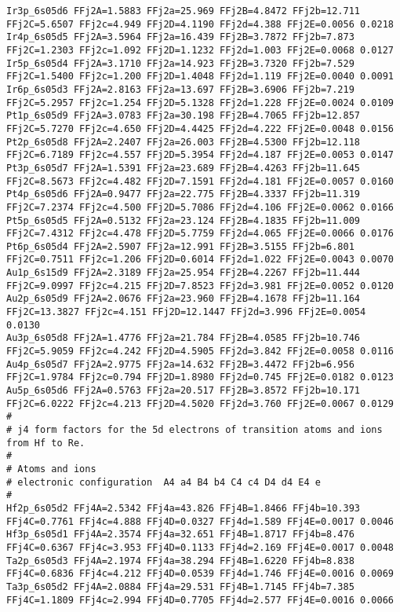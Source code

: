 {\begin{verbatim}
Ir3p_6s05d6 FFj2A=1.5883 FFj2a=25.969 FFj2B=4.8472 FFj2b=12.711 FFj2C=5.6507 FFj2c=4.949 FFj2D=4.1190 FFj2d=4.388 FFj2E=0.0056 0.0218 
Ir4p_6s05d5 FFj2A=3.5964 FFj2a=16.439 FFj2B=3.7872 FFj2b=7.873 FFj2C=1.2303 FFj2c=1.092 FFj2D=1.1232 FFj2d=1.003 FFj2E=0.0068 0.0127 
Ir5p_6s05d4 FFj2A=3.1710 FFj2a=14.923 FFj2B=3.7320 FFj2b=7.529 FFj2C=1.5400 FFj2c=1.200 FFj2D=1.4048 FFj2d=1.119 FFj2E=0.0040 0.0091 
Ir6p_6s05d3 FFj2A=2.8163 FFj2a=13.697 FFj2B=3.6906 FFj2b=7.219 FFj2C=5.2957 FFj2c=1.254 FFj2D=5.1328 FFj2d=1.228 FFj2E=0.0024 0.0109 
Pt1p_6s05d9 FFj2A=3.0783 FFj2a=30.198 FFj2B=4.7065 FFj2b=12.857 FFj2C=5.7270 FFj2c=4.650 FFj2D=4.4425 FFj2d=4.222 FFj2E=0.0048 0.0156 
Pt2p_6s05d8 FFj2A=2.2407 FFj2a=26.003 FFj2B=4.5300 FFj2b=12.118 FFj2C=6.7189 FFj2c=4.557 FFj2D=5.3954 FFj2d=4.187 FFj2E=0.0053 0.0147 
Pt3p_6s05d7 FFj2A=1.5391 FFj2a=23.689 FFj2B=4.4263 FFj2b=11.645 FFj2C=8.5673 FFj2c=4.482 FFj2D=7.1591 FFj2d=4.181 FFj2E=0.0057 0.0160 
Pt4p_6s05d6 FFj2A=0.9477 FFj2a=22.775 FFj2B=4.3337 FFj2b=11.319 FFj2C=7.2374 FFj2c=4.500 FFj2D=5.7086 FFj2d=4.106 FFj2E=0.0062 0.0166 
Pt5p_6s05d5 FFj2A=0.5132 FFj2a=23.124 FFj2B=4.1835 FFj2b=11.009 FFj2C=7.4312 FFj2c=4.478 FFj2D=5.7759 FFj2d=4.065 FFj2E=0.0066 0.0176 
Pt6p_6s05d4 FFj2A=2.5907 FFj2a=12.991 FFj2B=3.5155 FFj2b=6.801 FFj2C=0.7511 FFj2c=1.206 FFj2D=0.6014 FFj2d=1.022 FFj2E=0.0043 0.0070 
Au1p_6s15d9 FFj2A=2.3189 FFj2a=25.954 FFj2B=4.2267 FFj2b=11.444 FFj2C=9.0997 FFj2c=4.215 FFj2D=7.8523 FFj2d=3.981 FFj2E=0.0052 0.0120 
Au2p_6s05d9 FFj2A=2.0676 FFj2a=23.960 FFj2B=4.1678 FFj2b=11.164 FFj2C=13.3827 FFj2c=4.151 FFj2D=12.1447 FFj2d=3.996 FFj2E=0.0054 0.0130 
Au3p_6s05d8 FFj2A=1.4776 FFj2a=21.784 FFj2B=4.0585 FFj2b=10.746 FFj2C=5.9059 FFj2c=4.242 FFj2D=4.5905 FFj2d=3.842 FFj2E=0.0058 0.0116 
Au4p_6s05d7 FFj2A=2.9775 FFj2a=14.632 FFj2B=3.4472 FFj2b=6.956 FFj2C=1.9784 FFj2c=0.794 FFj2D=1.8980 FFj2d=0.745 FFj2E=0.0182 0.0123 
Au5p_6s05d6 FFj2A=0.5763 FFj2a=20.517 FFj2B=3.8572 FFj2b=10.171 FFj2C=6.0222 FFj2c=4.213 FFj2D=4.5020 FFj2d=3.760 FFj2E=0.0067 0.0129 
#
# j4 form factors for the 5d electrons of transition atoms and ions from Hf to Re.
#
# Atoms and ions
# electronic configuration  A4 a4 B4 b4 C4 c4 D4 d4 E4 e
#
Hf2p_6s05d2 FFj4A=2.5342 FFj4a=43.826 FFj4B=1.8466 FFj4b=10.393 FFj4C=0.7761 FFj4c=4.888 FFj4D=0.0327 FFj4d=1.589 FFj4E=0.0017 0.0046 
Hf3p_6s05d1 FFj4A=2.3574 FFj4a=32.651 FFj4B=1.8717 FFj4b=8.476 FFj4C=0.6367 FFj4c=3.953 FFj4D=0.1133 FFj4d=2.169 FFj4E=0.0017 0.0048 
Ta2p_6s05d3 FFj4A=2.1974 FFj4a=38.294 FFj4B=1.6220 FFj4b=8.838 FFj4C=0.6836 FFj4c=4.212 FFj4D=0.0539 FFj4d=1.746 FFj4E=0.0016 0.0069 
Ta3p_6s05d2 FFj4A=2.0884 FFj4a=29.531 FFj4B=1.7145 FFj4b=7.385 FFj4C=1.1809 FFj4c=2.994 FFj4D=0.7705 FFj4d=2.577 FFj4E=0.0016 0.0066 

\end{verbatim}}
